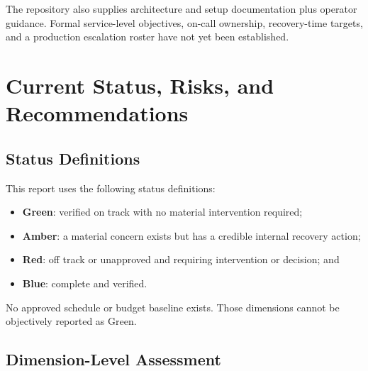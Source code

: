 \documentclass[12pt]{report}
\newcommand{\statusgreen}[1]{\textcolor{statusgreen}{\textbf{#1}}}
\newcommand{\statusamber}[1]{\textcolor{statusamber}{\textbf{#1}}}
\newcommand{\statusred}[1]{\textcolor{statusred}{\textbf{#1}}}
\newcommand{\statusblue}[1]{\textcolor{statusblue}{\textbf{#1}}}
\begin{document}
The repository also supplies architecture and setup documentation plus operator guidance. Formal service-level objectives, on-call ownership, recovery-time targets, and a production escalation roster have not yet been established.

\chapter{Current Status, Risks, and Recommendations}

\section{Status Definitions}

This report uses the following status definitions:

\begin{itemize}
  \item \statusgreen{Green}: verified on track with no material intervention required;
  \item \statusamber{Amber}: a material concern exists but has a credible internal recovery action;
  \item \statusred{Red}: off track or unapproved and requiring intervention or decision; and
  \item \statusblue{Blue}: complete and verified.
\end{itemize}

No approved schedule or budget baseline exists. Those dimensions cannot be objectively reported as Green.

\section{Dimension-Level Assessment}
\end{document}
